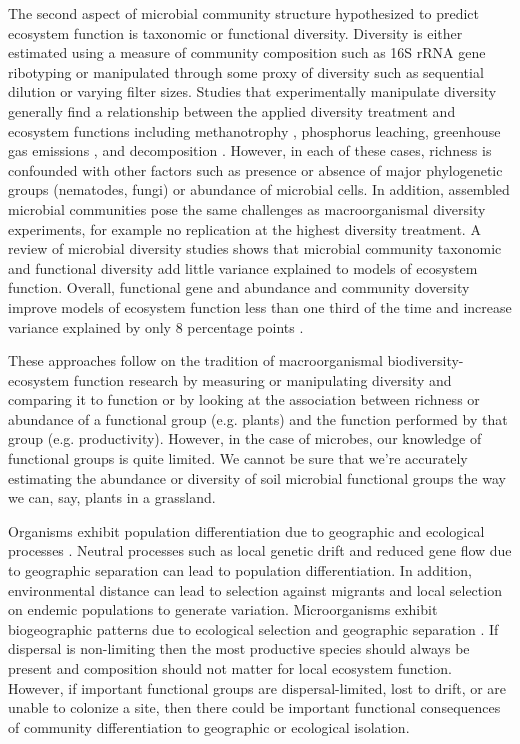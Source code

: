 \documentclass{article}
\begin{document}
The second aspect of microbial community structure hypothesized to predict
ecosystem function is taxonomic or functional
diversity. Diversity is either estimated using a measure of community
composition such as 16S rRNA gene ribotyping or manipulated through some proxy
of diversity such as sequential dilution or varying filter sizes. Studies that
experimentally manipulate diversity generally find a relationship between
the applied diversity treatment and ecosystem functions including methanotrophy
\citep{schnyder2018}, phosphorus leaching, greenhouse gas emissions
\citep{wagg2014}, and decomposition \citep{maron2018}. However, in each of these
cases, richness is confounded with other factors such as presence or absence of
major phylogenetic groups (nematodes, fungi) or abundance of microbial cells. In
addition, assembled microbial communities pose the same challenges as
macroorganismal diversity experiments, for example no replication at the highest
diversity treatment. A review of microbial diversity studies shows that
microbial community taxonomic and functional diversity add little variance
explained to models of ecosystem function. Overall, functional gene and
abundance and community doversity improve models of ecosystem function less than
one third of the time and increase variance explained by only 8 percentage
points \citep{graham2016}.

These approaches follow on the tradition of macroorganismal
biodiversity-ecosystem function research by measuring or manipulating diversity
and comparing it to function or by looking at the association between richness
or abundance of a functional group (e.g. plants) and the function performed by
that group (e.g. productivity). However, in the case of microbes, our knowledge
of functional groups is quite limited. We cannot be sure that we're accurately
estimating the abundance or diversity of soil microbial functional groups the
way we can, say, plants in a grassland.

Organisms exhibit population differentiation due to geographic and ecological
processes \citep{wright1943}. Neutral processes such as local genetic drift and
reduced gene flow due to geographic separation can lead to population
differentiation. In addition, environmental distance can lead to selection
against migrants \citep{hendry2004} and local selection on endemic populations
to generate variation. Microorganisms exhibit biogeographic patterns due to
ecological selection and geographic separation \citep{martiny2006}. If dispersal
is non-limiting then the most productive species should always be present and
composition should not matter for local ecosystem function. However, if important
functional groups are dispersal-limited, lost to drift, or are unable to
colonize a site, then there could be important functional consequences of
community differentiation to geographic or ecological isolation.
\end{document}
